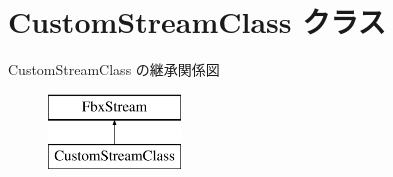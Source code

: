 \hypertarget{class_custom_stream_class}{}\section{Custom\+Stream\+Class クラス}
\label{class_custom_stream_class}
Custom\+Stream\+Class の継承関係図\begin{figure}[H]
\begin{center}
\leavevmode
\includegraphics[height=2.000000cm]{class_custom_stream_class}
\end{center}
\end{figure}
